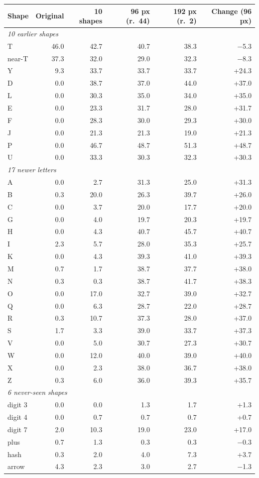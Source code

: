 
\begin{tabular}{lrrrrr}
\toprule
Shape & Original & 10 shapes & 96 px (r.~44) & 192 px (r.~2) & Change (96 px) \\
\midrule
\multicolumn{6}{l}{\emph{10 earlier shapes}} \\
T & 46.0 & 42.7 & 40.7 & 38.3 & $-$5.3 \\
near-T & 37.3 & 32.0 & 29.0 & 32.3 & $-$8.3 \\
Y & 9.3 & 33.7 & 33.7 & 33.7 & +24.3 \\
D & 0.0 & 38.7 & 37.0 & 44.0 & +37.0 \\
L & 0.0 & 30.3 & 35.0 & 34.0 & +35.0 \\
E & 0.0 & 23.3 & 31.7 & 28.0 & +31.7 \\
F & 0.0 & 28.3 & 30.0 & 29.3 & +30.0 \\
J & 0.0 & 21.3 & 21.3 & 19.0 & +21.3 \\
P & 0.0 & 46.7 & 48.7 & 51.3 & +48.7 \\
U & 0.0 & 33.3 & 30.3 & 32.3 & +30.3 \\
\midrule
\multicolumn{6}{l}{\emph{17 newer letters}} \\
A & 0.0 & 2.7 & 31.3 & 25.0 & +31.3 \\
B & 0.3 & 20.0 & 26.3 & 39.7 & +26.0 \\
C & 0.0 & 3.7 & 20.0 & 17.7 & +20.0 \\
G & 0.0 & 4.0 & 19.7 & 20.3 & +19.7 \\
H & 0.0 & 4.3 & 40.7 & 45.7 & +40.7 \\
I & 2.3 & 5.7 & 28.0 & 35.3 & +25.7 \\
K & 0.0 & 4.3 & 39.3 & 41.0 & +39.3 \\
M & 0.7 & 1.7 & 38.7 & 37.7 & +38.0 \\
N & 0.3 & 0.3 & 38.7 & 41.7 & +38.3 \\
O & 0.0 & 17.0 & 32.7 & 39.0 & +32.7 \\
Q & 0.0 & 6.3 & 28.7 & 22.0 & +28.7 \\
R & 0.3 & 10.7 & 37.3 & 28.0 & +37.0 \\
S & 1.7 & 3.3 & 39.0 & 33.7 & +37.3 \\
V & 0.0 & 5.0 & 30.7 & 27.3 & +30.7 \\
W & 0.0 & 12.0 & 40.0 & 39.0 & +40.0 \\
X & 0.0 & 2.3 & 38.0 & 36.7 & +38.0 \\
Z & 0.3 & 6.0 & 36.0 & 39.3 & +35.7 \\
\midrule
\multicolumn{6}{l}{\emph{6 never-seen shapes}} \\
digit 3 & 0.0 & 0.0 & 1.3 & 1.7 & +1.3 \\
digit 4 & 0.0 & 0.7 & 0.7 & 0.7 & +0.7 \\
digit 7 & 2.0 & 10.3 & 19.0 & 23.0 & +17.0 \\
plus & 0.7 & 1.3 & 0.3 & 0.3 & $-$0.3 \\
hash & 0.3 & 2.0 & 4.0 & 7.3 & +3.7 \\
arrow & 4.3 & 2.3 & 3.0 & 2.7 & $-$1.3 \\
\bottomrule
\end{tabular}
